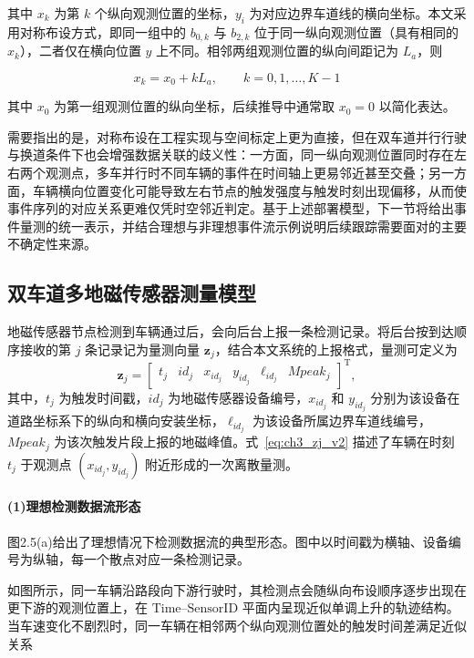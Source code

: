 \documentclass{xdupgthesis}
\begin{document}
其中 $x_k$ 为第 $k$ 个纵向观测位置的坐标，$y_i$ 为对应边界车道线的横向坐标。本文采用对称布设方式，即同一组中的 $b_{0,k}$ 与 $b_{2,k}$ 位于同一纵向观测位置（具有相同的 $x_k$），二者仅在横向位置 $y$ 上不同。相邻两组观测位置的纵向间距记为 $L_a$，则

\begin{equation}
	x_k = x_0 + kL_a,
	\qquad k=0,1,\ldots,K-1
	\tag{2-5}
\end{equation}

其中 $x_0$ 为第一组观测位置的纵向坐标，后续推导中通常取 $x_0=0$ 以简化表达。

需要指出的是，对称布设在工程实现与空间标定上更为直接，但在双车道并行行驶与换道条件下也会增强数据关联的歧义性：一方面，同一纵向观测位置同时存在左右两个观测点，多车并行时不同车辆的事件在时间轴上更易邻近甚至交叠；另一方面，车辆横向位置变化可能导致左右节点的触发强度与触发时刻出现偏移，从而使事件序列的对应关系更难仅凭时空邻近判定。基于上述部署模型，下一节将给出事件量测的统一表示，并结合理想与非理想事件流示例说明后续跟踪需要面对的主要不确定性来源。

\subsection{双车道多地磁传感器测量模型}

地磁传感器节点检测到车辆通过后，会向后台上报一条检测记录。将后台按到达顺序接收的第 $j$ 条记录记为量测向量 $\mathbf z_j$，结合本文系统的上报格式，量测可定义为
\begin{equation}
	\mathbf z_j=
	\begin{bmatrix}
		t_j &
		id_j &
		x_{id_j} &
		y_{id_j} &
		\ell_{id_j} &
		Mpeak_j
	\end{bmatrix}^{\mathrm T},
	\label{eq:ch3_zj_v2}
\end{equation}
其中，$t_j$ 为触发时间戳，$id_j$ 为地磁传感器设备编号，$x_{id_j}$ 和 $y_{id_j}$ 分别为该设备在道路坐标系下的纵向和横向安装坐标，$\ell_{id_j}$ 为该设备所属边界车道线编号，$Mpeak_j$ 为该次触发片段上报的地磁峰值。式~\eqref{eq:ch3_zj_v2} 描述了车辆在时刻 $t_j$ 于观测点 $(x_{id_j},y_{id_j})$ 附近形成的一次离散量测。

\paragraph{(1)理想检测数据流形态}


图2.5(a)给出了理想情况下检测数据流的典型形态。图中以时间戳为横轴、设备编号为纵轴，每一个散点对应一条检测记录。

如图所示，同一车辆沿路段向下游行驶时，其检测点会随纵向布设顺序逐步出现在更下游的观测位置上，在 $\text{Time--SensorID}$ 平面内呈现近似单调上升的轨迹结构。当车速变化不剧烈时，同一车辆在相邻两个纵向观测位置处的触发时间差满足近似关系
\end{document}
